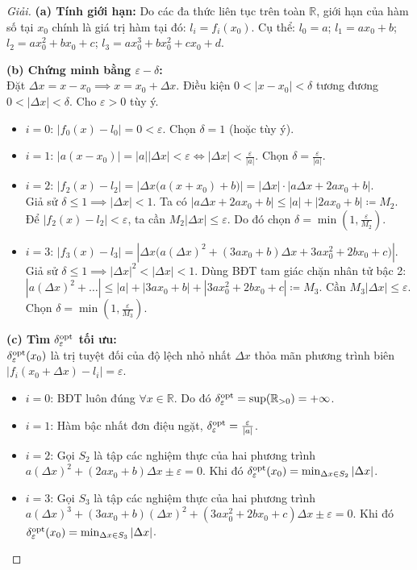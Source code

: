 \documentclass{article}
\begin{document}
\begin{proof}[Giải]
	\textbf{(a) Tính giới hạn:}
	Do các đa thức liên tục trên toàn $\mathbb{R}$, giới hạn của hàm số tại $x_0$ chính là giá trị hàm tại đó: $l_i = f_i(x_0)$.
	Cụ thể: $l_0 = a$; $l_1 = ax_0 + b$; $l_2 = ax_0^2 + bx_0 + c$; $l_3 = ax_0^3 + bx_0^2 + cx_0 + d$.
	
	\textbf{(b) Chứng minh bằng $\varepsilon-\delta$:}\\
	Đặt $\Delta x = x - x_0 \implies x = x_0 + \Delta x$. Điều kiện $0 < |x-x_0| < \delta$ tương đương $0 < |\Delta x| < \delta$. Cho $\varepsilon > 0$ tùy ý.
	\begin{itemize}
		\item $i=0$: $|f_0(x) - l_0| = 0 < \varepsilon$. Chọn $\delta = 1$ (hoặc tùy ý).
		\item $i=1$: $|a(x-x_0)| = |a||\Delta x| < \varepsilon \iff |\Delta x| < \frac{\varepsilon}{|a|}$. Chọn $\delta = \frac{\varepsilon}{|a|}$.
		\item $i=2$: $|f_2(x) - l_2| = |\Delta x \big( a(x+x_0) + b \big)| = |\Delta x| \cdot |a\Delta x + 2ax_0 + b|$.\\
		Giả sử $\delta \le 1 \implies |\Delta x| < 1$. Ta có $|a\Delta x + 2ax_0 + b| \le |a| + |2ax_0+b| \coloneqq M_2$. Để $|f_2(x)-l_2| < \varepsilon$, ta cần $M_2 |\Delta x| \le \varepsilon$. Do đó chọn $\delta = \min\left(1, \frac{\varepsilon}{M_2}\right)$.
		\item $i=3$: $|f_3(x) - l_3| = |\Delta x \big( a(\Delta x)^2 + (3ax_0+b)\Delta x + 3ax_0^2+2bx_0+c \big)|$.\\
		Giả sử $\delta \le 1 \implies |\Delta x|^2 < |\Delta x| < 1$. Dùng BĐT tam giác chặn nhân tử bậc 2: $|a(\Delta x)^2 + \ldots| \le |a| + |3ax_0+b| + |3ax_0^2+2bx_0+c| \coloneqq M_3$. Cần $M_3 |\Delta x| \le \varepsilon$. Chọn $\delta = \min\left(1, \frac{\varepsilon}{M_3}\right)$.
	\end{itemize}
	
	\textbf{(c) Tìm $\delta_\varepsilon^{\rm opt}$ tối ưu:}\\
	$\delta_\varepsilon^{\rm opt}(x_0)$ là trị tuyệt đối của độ lệch nhỏ nhất $\Delta x$ thỏa mãn phương trình biên $|f_i(x_0+\Delta x) - l_i| = \varepsilon$.
	\begin{itemize}
		\item $i=0$: BĐT luôn đúng $\forall x \in \mathbb{R}$. Do đó $\delta_\varepsilon^{\rm opt} = \sup(\mathbb{R}_{>0}) = +\infty$.
		\item $i=1$: Hàm bậc nhất đơn điệu ngặt, $\delta_\varepsilon^{\rm opt} = \frac{\varepsilon}{|a|}$.
		\item $i=2$: Gọi $S_2$ là tập các nghiệm thực của hai phương trình $a(\Delta x)^2 + (2ax_0+b)\Delta x \pm \varepsilon = 0$. Khi đó $\delta_\varepsilon^{\rm opt}(x_0) = \min_{\Delta x \in S_2} |\Delta x|$.
		\item $i=3$: Gọi $S_3$ là tập các nghiệm thực của hai phương trình $a(\Delta x)^3 + (3ax_0+b)(\Delta x)^2 + (3ax_0^2+2bx_0+c)\Delta x \pm \varepsilon = 0$. Khi đó $\delta_\varepsilon^{\rm opt}(x_0) = \min_{\Delta x \in S_3} |\Delta x|$.
	\end{itemize}
\end{proof}
\end{document}
